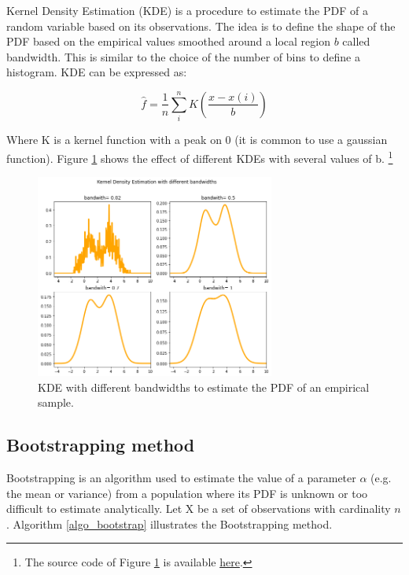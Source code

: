 Kernel Density Estimation (KDE) is a procedure to estimate the PDF of a random variable based on its observations. The idea is to define the shape of the PDF based on the empirical values smoothed around a local region $b$ called bandwidth. This is similar to the choice of the number of bins to define a histogram. KDE can be expressed as:

\begin{equation}
\hat{f}=\frac{1}{n}\sum_{i}^{n}K\left(\frac{x-x(i)}{b}\right)
\label{eq_KDE}
\end{equation}

Where K is a kernel function with a peak on 0 (it is common to use a gaussian function). Figure \ref{fig_KDE} shows the effect of different KDEs with several values of b. \footnote{The source code of Figure \ref{fig_KDE} is available \href{https://github.com/aletuf93/logproj/blob/master/examples/03.\%20Statistics.ipynb}{here}.}

\begin{figure}[hbt!]
\centering
\includegraphics[width=0.7\textwidth]{SectionLetsMath/elemStat_figures/fig_KDE.png}
\captionsetup{type=figure}
\caption{KDE with different bandwidths to estimate the PDF of an empirical sample.}
\label{fig_KDE}
\end{figure}

\subsection{Bootstrapping method} \label{secBootstrapping}

Bootstrapping is an algorithm used to estimate the value of a parameter $\alpha$ (e.g. the mean or variance) from a population where its PDF is unknown or too difficult to estimate analytically.  Let X be a set of observations with cardinality $n$. Algorithm \ref{algo_bootstrap} illustrates the Bootstrapping method.

